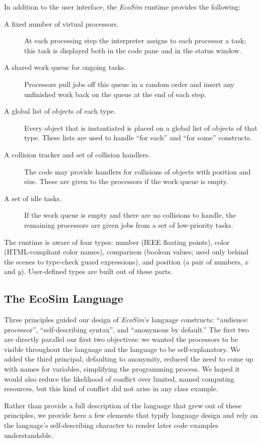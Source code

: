 \documentclass{sig-alternate}
\newcommand{\EcoSim}{\emph{EcoSim}}
\begin{document}
In addition to the user interface, the \EcoSim{} runtime provides the following:
\begin{description}
	\item[A fixed number of virtual processors.]
		At each processing step the interpreter assigns to each processor a task;
		this task is displayed both in the code pane and in the status window.
	\item[A shared work queue for ongoing tasks.]
		Processors pull jobs off this queue in a random order
		and insert any unfinished work back on the queue at the end of each step.
	\item[A global list of objects of each type.]
		Every object that is instantiated is placed on a global list of objects of that type.
		These lists are used to handle ``for each'' and ``for some'' constructs.
	\item[A collision tracker and set of collision handlers.]
		The code may provide handlers for collisions of objects with position and size.
		These are given to the processors if the work queue is empty.
	\item[A set of idle tasks.]
		If the work queue is empty and there are no collisions to handle,
		the remaining processors are given jobs from a set of low-priority tasks.
\end{description}

The runtime is aware of four types:
number (IEEE floating points), color (HTML-compliant color names), 
comparison (boolean values; used only behind the scenes to type-check guard expressions),
and position (a pair of numbers, $x$ and $y$).
User-defined types are built out of these parts.


\subsection{The EcoSim Language}
Three principles guided our design of \EcoSim{}'s language constructs:
``audience: processor'', ``self-describing syntax'', and ``anonymous by default.''
The first two are directly parallel our first two objectives:
we wanted the processors to be visible throughout the language
and the language to be self-explanatory.
We added the third principal, defaulting to anonymity,
reduced the need to come up with names for variables,
simplifying the programming process.
We hoped it would also reduce the likelihood of conflict over limited, named computing resources,
but this kind of conflict did not arise in any class example.

Rather than provide a full description of the language that grew out of these principles,
we provide here a few elements that typify language design
and rely on the language's self-describing character 
to render later code examples understandable.
\end{document}
